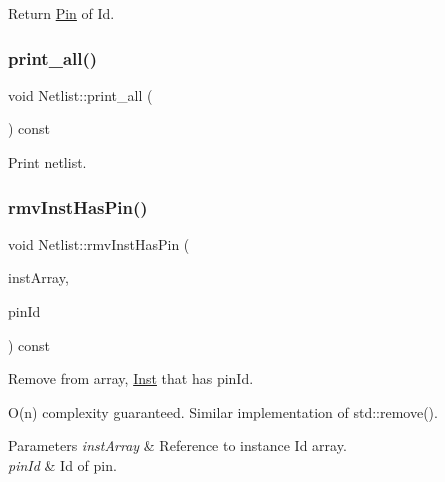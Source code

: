 Return \hyperlink{classPin}{Pin} of Id. 

\mbox{\label{classNetlist_ab4c7abc54d4524f5827a8609d7abd713}} 
\subsubsection{\texorpdfstring{print\+\_\+all()}{print\_all()}}
{\footnotesize\ttfamily void Netlist\+::print\+\_\+all (\begin{DoxyParamCaption}{ }\end{DoxyParamCaption}) const}

Print netlist. \mbox{\label{classNetlist_abba19cc3b269dda137f801a555899ca6}} 
\subsubsection{\texorpdfstring{rmv\+Inst\+Has\+Pin()}{rmvInstHasPin()}}
{\footnotesize\ttfamily void Netlist\+::rmv\+Inst\+Has\+Pin (\begin{DoxyParamCaption}\item[{std\+::vector$<$ \hyperlink{type_8h_a581e8093e28e7362f2b6937296190676}{Index\+Type} $>$ \&}]{inst\+Array,  }\item[{\hyperlink{type_8h_a581e8093e28e7362f2b6937296190676}{Index\+Type}}]{pin\+Id }\end{DoxyParamCaption}) const}



Remove from array, \hyperlink{classInst}{Inst} that has pin\+Id. 

O(n) complexity guaranteed. Similar implementation of std\+::remove().


\begin{DoxyParams}{Parameters}
{\em inst\+Array} & Reference to instance Id array. \\
\hline
{\em pin\+Id} & Id of pin. \\
\hline
\end{DoxyParams}
\mbox{\label{classNetlist_a306b7d5127774b04081c9bf3b26aebd3}} 
